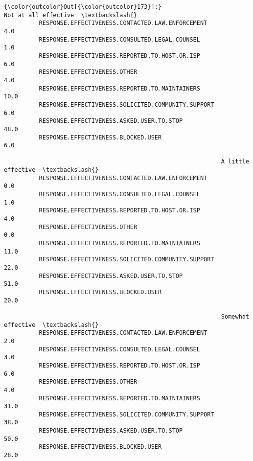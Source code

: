 \documentclass[11pt]{article}
\begin{document}
            \begin{Verbatim}[commandchars=\\\{\}]
{\color{outcolor}Out[{\color{outcolor}173}]:}                                                     Not at all effective  \textbackslash{}
          RESPONSE.EFFECTIVENESS.CONTACTED.LAW.ENFORCEMENT                     4.0   
          RESPONSE.EFFECTIVENESS.CONSULTED.LEGAL.COUNSEL                       1.0   
          RESPONSE.EFFECTIVENESS.REPORTED.TO.HOST.OR.ISP                       6.0   
          RESPONSE.EFFECTIVENESS.OTHER                                         4.0   
          RESPONSE.EFFECTIVENESS.REPORTED.TO.MAINTAINERS                      10.0   
          RESPONSE.EFFECTIVENESS.SOLICITED.COMMUNITY.SUPPORT                   6.0   
          RESPONSE.EFFECTIVENESS.ASKED.USER.TO.STOP                           48.0   
          RESPONSE.EFFECTIVENESS.BLOCKED.USER                                  6.0   
          
                                                              A little effective  \textbackslash{}
          RESPONSE.EFFECTIVENESS.CONTACTED.LAW.ENFORCEMENT                   0.0   
          RESPONSE.EFFECTIVENESS.CONSULTED.LEGAL.COUNSEL                     1.0   
          RESPONSE.EFFECTIVENESS.REPORTED.TO.HOST.OR.ISP                     4.0   
          RESPONSE.EFFECTIVENESS.OTHER                                       0.0   
          RESPONSE.EFFECTIVENESS.REPORTED.TO.MAINTAINERS                    11.0   
          RESPONSE.EFFECTIVENESS.SOLICITED.COMMUNITY.SUPPORT                22.0   
          RESPONSE.EFFECTIVENESS.ASKED.USER.TO.STOP                         51.0   
          RESPONSE.EFFECTIVENESS.BLOCKED.USER                               20.0   
          
                                                              Somewhat effective  \textbackslash{}
          RESPONSE.EFFECTIVENESS.CONTACTED.LAW.ENFORCEMENT                   2.0   
          RESPONSE.EFFECTIVENESS.CONSULTED.LEGAL.COUNSEL                     3.0   
          RESPONSE.EFFECTIVENESS.REPORTED.TO.HOST.OR.ISP                     6.0   
          RESPONSE.EFFECTIVENESS.OTHER                                       4.0   
          RESPONSE.EFFECTIVENESS.REPORTED.TO.MAINTAINERS                    31.0   
          RESPONSE.EFFECTIVENESS.SOLICITED.COMMUNITY.SUPPORT                38.0   
          RESPONSE.EFFECTIVENESS.ASKED.USER.TO.STOP                         50.0   
          RESPONSE.EFFECTIVENESS.BLOCKED.USER                               28.0   
          

\end{Verbatim}
\end{document}
